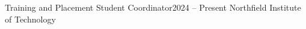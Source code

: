 \resumeSubheading
    {Training and Placement Student Coordinator}{2024 -- Present}
    {Northfield Institute of Technology}{}
